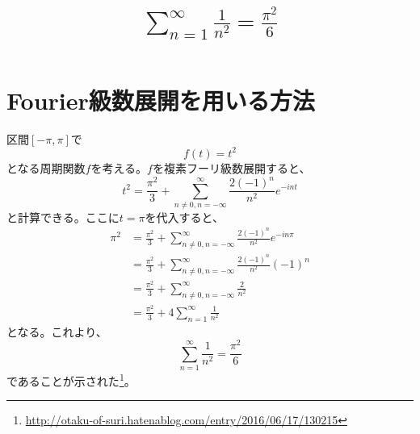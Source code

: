\documentclass{jsarticle}
\title{$\displaystyle\sum_{n=1}^{\infty}\frac{1}{n^{2}}=\frac{\pi^{2}}{6}$}
\begin{document}
\maketitle


\tableofcontents

\newpage

\section{Fourier級数展開を用いる方法}
区間$[-\pi,\pi]$で
\begin{equation}
	f(t)=t^{2}
\end{equation}
となる周期関数$f$を考える。$f$を複素フーリ級数展開すると、
\begin{equation}
	t^{2}=\frac{\pi^{2}}{3}+\sum_{n\ne 0,n=-\infty}^{\infty}\frac{2(-1)^{n}}{n^{2}}e^{-int}
\end{equation}
と計算できる。ここに$t=\pi$を代入すると、
\begin{align}
	\pi^{2}&=\frac{\pi^{2}}{3}+\sum_{n\ne 0,n=-\infty}^{\infty}\frac{2(-1)^{n}}{n^{2}}e^{-in\pi}\\
	&=\frac{\pi^{2}}{3}+\sum_{n\ne 0,n=-\infty}^{\infty}\frac{2(-1)^{n}}{n^{2}}(-1)^{n}\\
	&=\frac{\pi^{2}}{3}+\sum_{n\ne 0,n=-\infty}^{\infty}\frac{2}{n^{2}}\\
	&=\frac{\pi^{2}}{3}+4\sum_{n=1}^{\infty}\frac{1}{n^{2}}
\end{align}
となる。これより、
\begin{equation}
	\sum_{n=1}^{\infty}\frac{1}{n^{2}}=\frac{\pi^{2}}{6}
\end{equation}
であることが示された\footnote{\url{http://otaku-of-suri.hatenablog.com/entry/2016/06/17/130215}}。
\end{document}
